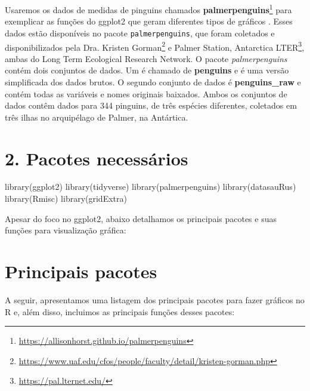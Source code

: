 \documentclass[
]{book}
\newenvironment{Shaded}{\begin{snugshade}}{\end{snugshade}}
\newcommand{\FunctionTok}[1]{\textcolor[rgb]{0,0,0}{#1}}
\newcommand{\NormalTok}[1]{#1}
\renewcommand{\href}[2]{#2\footnote{\url{#1}}}
\begin{document}
Usaremos os dados de medidas de pinguins chamados \href{https://allisonhorst.github.io/palmerpenguins}{\textbf{palmerpenguins}} para exemplicar as funções do ggplot2 que geram diferentes tipos de gráficos . Esses dados estão disponíveis no pacote \texttt{palmerpenguins}, que foram coletados e disponibilizados pela \href{https://www.uaf.edu/cfos/people/faculty/detail/kristen-gorman.php}{Dra. Kristen Gorman} e \href{https://pal.lternet.edu/}{Palmer Station, Antarctica LTER}, ambas do Long Term Ecological Research Network. O pacote \emph{palmerpenguins} contém dois conjuntos de dados. Um é chamado de \textbf{penguins} e é uma versão simplificada dos dados brutos. O segundo conjunto de dados é \textbf{penguins\_raw} e contém todas as variáveis e nomes originais baixados. Ambos os conjuntos de dados contêm dados para 344 pinguins, de três espécies diferentes, coletados em três ilhas no arquipélago de Palmer, na Antártica.

\hypertarget{pacotes-necessuxe1rios}{%
\section{2. Pacotes necessários}\label{pacotes-necessuxe1rios}}

\begin{Shaded}
\begin{Highlighting}[]

\FunctionTok{library}\NormalTok{(ggplot2)}
\FunctionTok{library}\NormalTok{(tidyverse)}
\FunctionTok{library}\NormalTok{(palmerpenguins)}
\FunctionTok{library}\NormalTok{(datasauRus)}
\FunctionTok{library}\NormalTok{(Rmisc)}
\FunctionTok{library}\NormalTok{(gridExtra)}
\end{Highlighting}
\end{Shaded}

Apesar do foco no ggplot2, abaixo detalhamos os principais pacotes e suas funções para visualização gráfica:

\hypertarget{principais-pacotes}{%
\section{Principais pacotes}\label{principais-pacotes}}

A seguir, apresentamos uma listagem dos principais pacotes para fazer gráficos no R e, além disso, incluimos as principais funções desses pacotes:
\end{document}
